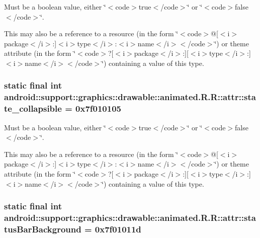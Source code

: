 Must be a boolean value, either \char`\"{}$<$code$>$true$<$/code$>$\char`\"{} or \char`\"{}$<$code$>$false$<$/code$>$\char`\"{}. 

This may also be a reference to a resource (in the form \char`\"{}$<$code$>$@\mbox{[}$<$i$>$package$<$/i$>$:\mbox{]}$<$i$>$type$<$/i$>$:$<$i$>$name$<$/i$>$$<$/code$>$\char`\"{}) or theme attribute (in the form \char`\"{}$<$code$>$?\mbox{[}$<$i$>$package$<$/i$>$:\mbox{]}\mbox{[}$<$i$>$type$<$/i$>$:\mbox{]}$<$i$>$name$<$/i$>$$<$/code$>$\char`\"{}) containing a value of this type. \hypertarget{classandroid_1_1support_1_1graphics_1_1drawable_1_1animated_1_1_r_1_1attr_716ef46227b8907567db245c0207b287}{
\subsubsection[{state\_\-collapsible}]{\setlength{\rightskip}{0pt plus 5cm}static final int android::support::graphics::drawable::animated.R.R::attr::state\_\-collapsible = 0x7f010105}}
\label{classandroid_1_1support_1_1graphics_1_1drawable_1_1animated_1_1_r_1_1attr_716ef46227b8907567db245c0207b287}


Must be a boolean value, either \char`\"{}$<$code$>$true$<$/code$>$\char`\"{} or \char`\"{}$<$code$>$false$<$/code$>$\char`\"{}. 

This may also be a reference to a resource (in the form \char`\"{}$<$code$>$@\mbox{[}$<$i$>$package$<$/i$>$:\mbox{]}$<$i$>$type$<$/i$>$:$<$i$>$name$<$/i$>$$<$/code$>$\char`\"{}) or theme attribute (in the form \char`\"{}$<$code$>$?\mbox{[}$<$i$>$package$<$/i$>$:\mbox{]}\mbox{[}$<$i$>$type$<$/i$>$:\mbox{]}$<$i$>$name$<$/i$>$$<$/code$>$\char`\"{}) containing a value of this type. \hypertarget{classandroid_1_1support_1_1graphics_1_1drawable_1_1animated_1_1_r_1_1attr_13591a3101fb9c4dffb858ef8d8cdeb9}{
\subsubsection[{statusBarBackground}]{\setlength{\rightskip}{0pt plus 5cm}static final int android::support::graphics::drawable::animated.R.R::attr::statusBarBackground = 0x7f01011d}}
\label{classandroid_1_1support_1_1graphics_1_1drawable_1_1animated_1_1_r_1_1attr_13591a3101fb9c4dffb858ef8d8cdeb9}


